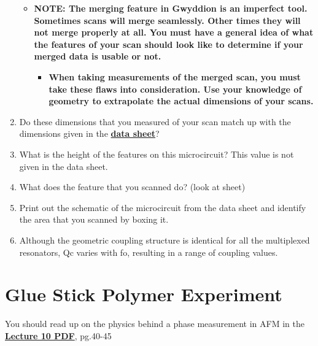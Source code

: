 \documentclass{../lab}
\begin{document}
\begin{enumerate}
    \begin{itemize}
        \item ​​\textbf{NOTE: The merging feature in Gwyddion is an imperfect tool.  Sometimes scans will merge seamlessly. Other times they will not merge properly at all. You must have a general idea of what the features of your scan should look like to determine if your merged data is usable or not.}

        \begin{itemize}
            \item \textbf{​When taking measurements of the merged scan, you must take these flaws into consideration.  Use your knowledge of geometry to extrapolate the actual dimensions of your scans.}

        \end{itemize}

    \end{itemize}

    \item Do these dimensions that you measured of your scan match up with the dimensions given in the \href{http://experimentationlab.berkeley.edu/sites/default/files/AFMImages/CSQ\_Resonators\_1July2011\%20.pdf}{\textbf{data sheet}}?

    \item What is the height of the features on this microcircuit?  This value is not given in the data sheet.

    \item What does the feature that you scanned do? (look at sheet)

    \item Print out the schematic of the microcircuit from the data sheet and identify the area that you scanned by boxing it.

    \item Although the geometric coupling structure is identical for all the multiplexed resonators, Qc varies with fo, resulting in a range of coupling values.

\end{enumerate}

\section{Glue Stick Polymer Experiment}

You should read up on the physics behind a phase measurement in AFM in the \href{http://experimentationlab.berkeley.edu/sites/default/files/AFMImages/Lecture\_10\_AFM.pdf}{\textbf{Lecture 10 PDF}}, pg.40-45
\end{document}
